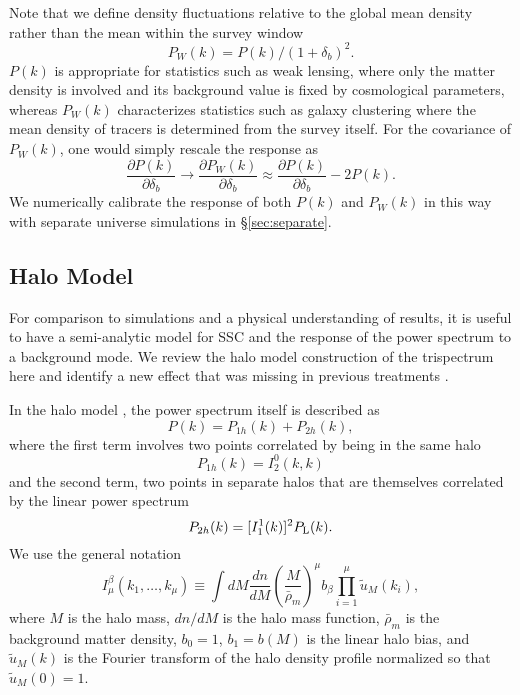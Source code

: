 \documentclass[prd,twocolumn,amsmath,amssymb,floatfix,superscriptaddress]{revtex4-1}
\newcommand{\lin}{{\rm L}}
\newcommand{\tu}{\tilde{u}}
\begin{document}
Note that we define density fluctuations relative to the global mean density rather
than the mean within the survey window  \cite{dePutter:2011ah}
\begin{equation}
P_W(k) =  P(k)/(1+\delta_b)^2.
\label{eqn:PW}
\end{equation}
$P(k)$ is appropriate for statistics such as weak lensing,
 where only the matter 
density is involved and its background value is fixed by cosmological
parameters, whereas
$P_W(k)$ characterizes statistics such as galaxy clustering where the mean density of
tracers is determined from the survey itself.
For the covariance
of $P_W(k)$, one would simply rescale the response as 
%
\begin{equation}
\frac{\partial P(k)}{\partial \delta_b} \rightarrow
\frac{\partial  P_W(k)}{\partial \delta_b} \approx
 \frac{\partial  P(k)}{\partial \delta_b}- 2 P(k).
 \label{eqn:localresponse}
\end{equation}
%
We numerically calibrate the response of both $P(k)$ and $P_W(k)$ in this way with separate universe simulations in 
\S \ref{sec:separate}.

\subsection{Halo Model}
\label{sec:sschalo}

For comparison to simulations and a physical understanding of results,  it is useful to have a semi-analytic model for SSC
and the response of the power spectrum to a background mode.    We review the halo
model construction of the trispectrum here and identify a new effect that was missing
in previous treatments \cite{Hamiltonetal:06,Takada:2013wfa}.


In the halo model
 \cite{PeacockSmith:00,Seljak:00,MaFry:00,CooraySheth:02}, 
 the power spectrum itself is described as
\begin{equation}
P(k) = P_{1h}(k) + P_{2h}(k),
\end{equation}
%
where the first term involves two points correlated by being in the
 same halo 
 \begin{equation}
 P_{1h}(k)=I_2^0(k,k)
 \end{equation}
 and the second term, two points in separate halos that are themselves correlated
 by the linear power spectrum
 \begin{equation}
P_{2h}(k)= [I_1^1(k)]^2 P_\lin(k).
 \end{equation}
We use the general notation \cite{CoorayHu:01}
%
 \begin{equation}
 I^\beta_\mu(k_1,\dots,k_\mu)\equiv 
\int\!\!dM\frac{dn}{dM}\left(\frac{M}{\bar{\rho}_m}\right)^\mu b_\beta  \prod_{i=1}^\mu
 \tu_M(k_i),
\end{equation}
%
where $M$ is the halo mass, $dn/dM$ is the halo mass function, $\bar\rho_m$ is the background
matter density, $b_0=1$,  $b_1=b(M)$ is the linear halo bias, and $\tilde u_M(k)$ is the Fourier transform of the halo density profile
normalized so that $\tilde u_M(0)=1$.
\end{document}
